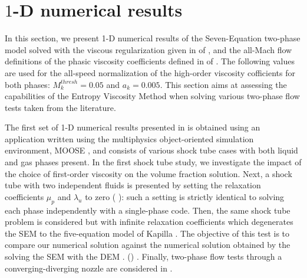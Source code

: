 \documentclass[preprint,10pt]{elsarticle}
\begin{document}
\section{$1$-D numerical results}\label{sec:results}
%
In this section, we present 1-D numerical results of the Seven-Equation two-phase model solved with the viscous regularization given in  of , 
and the all-Mach flow definitions of the phasic viscosity coefficients defined in  of .
The following values are used for the all-speed normalization of the high-order viscosity cofficients for both phases: $M_k^{thresh}=0.05$ and $a_k=0.005$. 
This section aims at assessing the capabilities of the Entropy 
Viscosity Method when solving various two-phase flow tests taken from the literature. 

The first set  of 1-D numerical results presented in  is obtained using an application written using the multiphysics object-oriented simulation environment, MOOSE
\cite{Moose2009}, and consists of various shock tube cases with both liquid and gas phases present. 
In the first shock tube study, we investigate the impact of the choice of first-order viscosity on the volume fraction solution. 
Next, a shock tube with two independent fluids is presented by setting the relaxation coefficients $\mu_p$ and $\lambda_u$ to zero ( ): 
such a setting is strictly identical to solving each phase independently with a single-phase code. 
Then, the same shock tube problem is considered but with infinite relaxation coefficients which degenerates the SEM to the five-equation model of Kapilla \cite{Kapila_2001}. The objective of this test is to compare our numerical solution against the numerical solution obtained by the solving the SEM with the DEM \cite{Berry_NED2010}. 
() . 
Finally, two-phase flow tests through a converging-diverging nozzle are considered in . 
\end{document}

